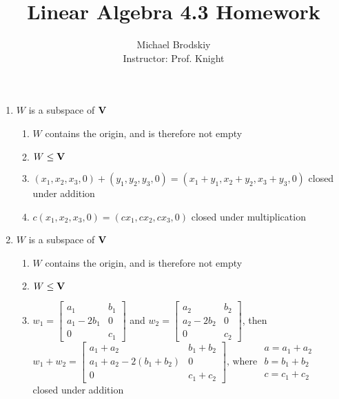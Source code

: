 \documentclass[12pt]{article}
\title{Linear Algebra 4.3 Homework}
\date{}
\author{Michael Brodskiy\\ \small Instructor: Prof. Knight}
\begin{document}
\maketitle

\begin{enumerate}

  \item $W$ is a subspace of $\bold{V}$

    \begin{enumerate}

      \item $W$ contains the origin, and is therefore not empty \textcolor{green}{\checkmark}

      \item $W\leq\bold{V}$ \textcolor{green}{\checkmark}

      \item $(x_1,x_2,x_3,0)+(y_1,y_2,y_3,0)=(x_1+y_1,x_2+y_2,x_3+y_3,0)$ closed under addition \textcolor{green}{\checkmark}

      \item $c(x_1,x_2,x_3,0)=(cx_1,cx_2,cx_3,0)$ closed under multiplication \textcolor{green}{\checkmark}

    \end{enumerate}

    \setcounter{enumi}{3}

  \item $W$ is a subspace of $\bold{V}$

    \begin{enumerate}

      \item $W$ contains the origin, and is therefore not empty \textcolor{green}{\checkmark}

      \item $W\leq\bold{V}$ \textcolor{green}{\checkmark}

      \item $w_1=\begin{bmatrix} a_1 & b_1\\ a_1-2b_1 & 0\\ 0 & c_1  \end{bmatrix}$ and $w_2=\begin{bmatrix} a_2 & b_2\\ a_2-2b_2 & 0\\ 0 & c_2  \end{bmatrix}$, then\\ $w_1+w_2=\begin{bmatrix} a_1+a_2 & b_1+b_2\\ a_1+a_2-2(b_1+b_2) & 0\\ 0 & c_1+c_2  \end{bmatrix}\text{, where }\begin{array}{c} a=a_1+a_2\\ b=b_1+b_2\\ c=c_1+c_2  \end{array}$\\ closed under addition \textcolor{green}{\checkmark}


\end{enumerate}
\end{enumerate}
\end{document}
